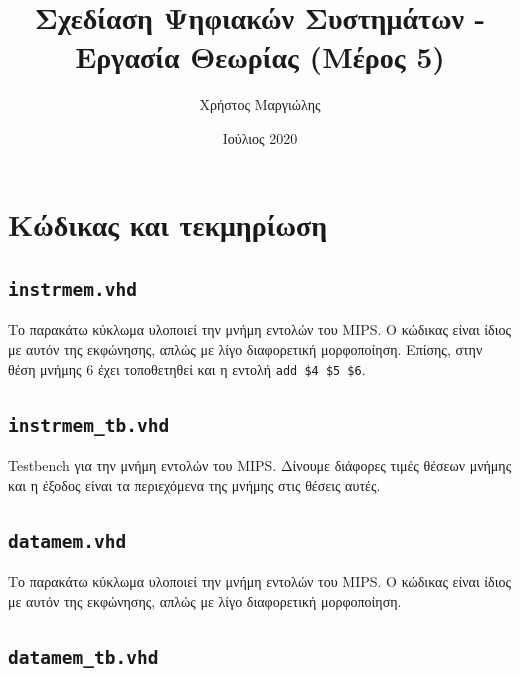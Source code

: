 \documentclass{article}
\title{Σχεδίαση Ψηφιακών Συστημάτων - Εργασία Θεωρίας (Μέρος 5)}
\author{Χρήστος Μαργιώλης}
\date{Ιούλιος 2020}
\begin{document}
\begin{titlepage}
        \maketitle
\end{titlepage}

\renewcommand{\contentsname}{Περιεχόμενα}
\tableofcontents

\section{Κώδικας και τεκμηρίωση}

\subsection{\lstinline{instrmem.vhd}}

Το παρακάτω κύκλωμα υλοποιεί την μνήμη εντολών του MIPS. Ο κώδικας
είναι ίδιος με αυτόν της εκφώνησης, απλώς με λίγο διαφορετική μορφοποίηση. 
Επίσης, στην θέση μνήμης 6 έχει τοποθετηθεί και η εντολή 
\lstinline{add $4 $5 $6}. \\


\pagebreak

\subsection{\lstinline{instrmem_tb.vhd}}

Testbench για την μνήμη εντολών του MIPS. Δίνουμε διάφορες τιμές
θέσεων μνήμης και η έξοδος είναι τα περιεχόμενα της μνήμης στις θέσεις αυτές. \\


\pagebreak

\subsection{\lstinline{datamem.vhd}}

Το παρακάτω κύκλωμα υλοποιεί την μνήμη εντολών του MIPS. Ο κώδικας
είναι ίδιος με αυτόν της εκφώνησης, απλώς με λίγο διαφορετική μορφοποίηση. \\


\pagebreak

\subsection{\lstinline{datamem_tb.vhd}}
\end{document}
